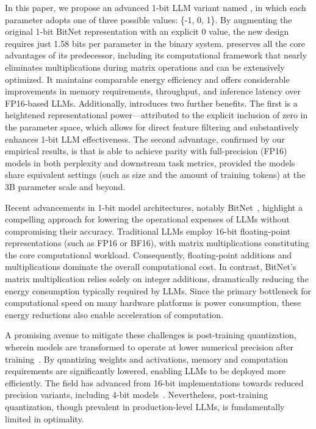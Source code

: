 In this paper, we propose an advanced 1-bit LLM variant named \textbf{}, in which each parameter adopts one of three possible values: \{-1, 0, 1\}. By augmenting the original 1-bit BitNet representation with an explicit 0 value, the new design requires just 1.58 bits per parameter in the binary system.  preserves all the core advantages of its predecessor, including its computational framework that nearly eliminates multiplications during matrix operations and can be extensively optimized. It maintains comparable energy efficiency and offers considerable improvements in memory requirements, throughput, and inference latency over FP16-based LLMs. Additionally,  introduces two further benefits. The first is a heightened representational power—attributed to the explicit inclusion of zero in the parameter space, which allows for direct feature filtering and substantively enhances 1-bit LLM effectiveness. The second advantage, confirmed by our empirical results, is that  is able to achieve parity with full-precision (FP16) models in both perplexity and downstream task metrics, provided the models share equivalent settings (such as size and the amount of training tokens) at the 3B parameter scale and beyond.

Recent advancements in 1-bit model architectures, notably BitNet~\cite{bitnet}, highlight a compelling approach for lowering the operational expenses of LLMs without compromising their accuracy. Traditional LLMs employ 16-bit floating-point representations (such as FP16 or BF16), with matrix multiplications constituting the core computational workload. Consequently, floating-point additions and multiplications dominate the overall computational cost. In contrast, BitNet’s matrix multiplication relies solely on integer additions, dramatically reducing the energy consumption typically required by LLMs. Since the primary bottleneck for computational speed on many hardware platforms is power consumption, these energy reductions also enable acceleration of computation.

A promising avenue to mitigate these challenges is post-training quantization, wherein models are transformed to operate at lower numerical precision after training~\cite{smoothquant, gptq, quip, quip_sharp}. By quantizing weights and activations, memory and computation requirements are significantly lowered, enabling LLMs to be deployed more efficiently. The field has advanced from 16-bit implementations towards reduced precision variants, including 4-bit models~\cite{gptq, awq}. Nevertheless, post-training quantization, though prevalent in production-level LLMs, is fundamentally limited in optimality.

